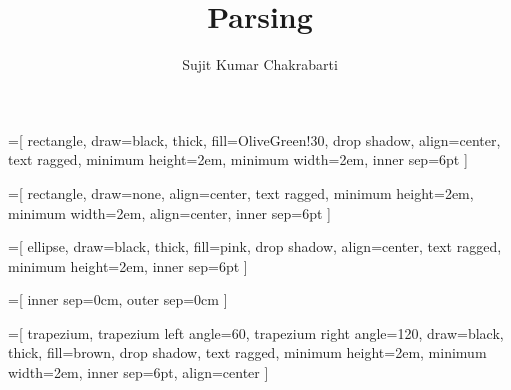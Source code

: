 \documentclass{beamer}
\title[Sujit]{Parsing}
\author{Sujit Kumar Chakrabarti}
\institute{IIITB}
\date{}
\begin{document}
\maketitle


\newcommand{\myheader}[1]{
	{\color{purple}
		\begin{Large}
			\begin{center}
				{#1}
			\end{center}
		\end{Large}
	}
}
\newcommand{\myminorheader}[1]{
	{\color{purple}
		\begin{large}
			{#1}
		\end{large}
	}
}

\newcommand{\myprod}[0]{\hspace{0.5cm}$\rightarrow$\hspace{0.5cm}}
\newcommand{\mychoice}[0]{\hspace{0.75cm}$|$\hspace{0.25cm}}
\newcommand{\myderiv}[0]{\hspace{0.5cm}$\Rightarrow$\hspace{0.5cm}}


=[%
      rectangle, draw=black, thick, fill=OliveGreen!30, drop shadow, align=center,
      text ragged, minimum height=2em, minimum width=2em, inner sep=6pt
]

=[%
      rectangle, draw=none,  align=center,
      text ragged, minimum height=2em, minimum width=2em, align=center, inner sep=6pt
]

=[%
      ellipse, draw=black, thick, fill=pink, drop shadow, align=center,
      text ragged, minimum height=2em, inner sep=6pt
]

=[%
      inner sep=0cm, outer sep=0cm
]

=[%
      trapezium, trapezium left angle=60, trapezium right angle=120, draw=black, thick, fill=brown, drop shadow,
      text ragged, minimum height=2em, minimum width=2em, inner sep=6pt, align=center
]
\end{document}

